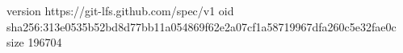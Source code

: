 version https://git-lfs.github.com/spec/v1
oid sha256:313e0535b52bd8d77bb11a054869f62e2a07cf1a58719967dfa260c5e32fae0c
size 196704
